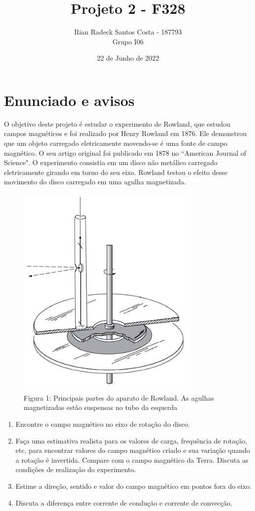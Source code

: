 \documentclass[12pt, letterpaper]{article}
\title{Projeto 2 - F328}
\author{Rian Radeck Santos Costa - 187793 \\ Grupo I06}
\date{22 de Junho de 2022}
\begin{document}
\maketitle
\newpage
\tableofcontents
\newpage

\section{Enunciado e avisos}
	O objetivo deste projeto é estudar o experimento de Rowland, que estudou campos magnéticos e foi realizado por Henry Rowland em 1876. Ele demonstrou que um objeto carregado eletricamente movendo-se é uma fonte de campo magnético. O seu artigo original foi publicado em 1878 no ``American Journal of Science". O experimento consistia em um disco não metálico carregado eletricamente girando em torno do seu eixo. Rowland testou o efeito desse movimento do disco carregado em uma agulha magnetizada.

	\begin{figure}[h]
        \centering
        \includegraphics[width=0.8\textwidth]{rowland}
        \\{Figura 1: Principais partes do aparato de Rowland. As agulhas magnetizadas estão suspensas no tubo da esquerda}
        \label{fig:rowland}
    \end{figure}

    \begin{enumerate}
    	\item Encontre o campo magnético no eixo de rotação do disco.
    	\item Faça uma estimativa realista para os valores de carga, frequência de rotação, etc, para encontrar valores do campo magnético criado e sua variação quando a rotação é invertida. Compare com o campo magnético da Terra. Discuta as condições de realização do experimento.
    	\item Estime a direção, sentido e valor do campo magnético em pontos fora do eixo.
    	\item Discuta a diferença entre corrente de condução e corrente de convecção.
    \end{enumerate}
\end{document}
